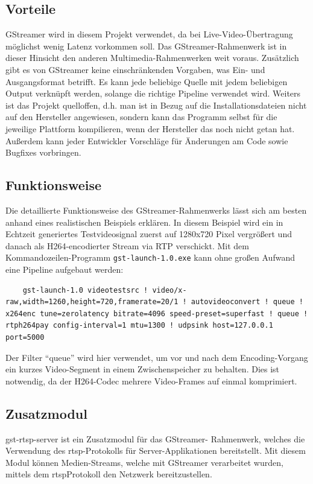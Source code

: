 \subsection{Vorteile}
GStreamer wird in diesem Projekt verwendet, da bei Live-Video-Übertragung möglichst wenig Latenz vorkommen soll.
Das GStreamer-Rahmenwerk ist in dieser Hinsicht den anderen Multimedia-Rahmenwerken weit voraus.
Zusätzlich gibt es von GStreamer keine einschränkenden Vorgaben, was Ein- und Ausgangsformat betrifft.
Es kann jede beliebige Quelle mit jedem beliebigen Output verknüpft werden, solange die richtige Pipeline verwendet wird.
Weiters ist das Projekt quelloffen, d.h. man ist in Bezug auf die Installationsdateien nicht auf den Hersteller angewiesen, sondern kann das Programm selbst für die jeweilige Plattform kompilieren, wenn der Hersteller das noch nicht getan hat.
Außerdem kann jeder Entwickler Vorschläge für Änderungen am Code sowie Bugfixes vorbringen.
\subsection{Funktionsweise}
Die detaillierte Funktionsweise des GStreamer-Rahmenwerks lässt sich am besten anhand eines realistischen Beispiels erklären.
In diesem Beispiel wird ein in Echtzeit generiertes Testvideosignal zuerst auf 1280x720 Pixel vergrößert und danach als H264-encodierter Stream via RTP verschickt.
Mit dem Kommandozeilen-Programm \texttt{gst-launch-1.0.exe} kann ohne großen Aufwand eine Pipeline aufgebaut werden:
\begin{verbatim}
    gst-launch-1.0 videotestsrc ! video/x-raw,width=1260,height=720,framerate=20/1 ! autovideoconvert ! queue ! x264enc tune=zerolatency bitrate=4096 speed-preset=superfast ! queue ! rtph264pay config-interval=1 mtu=1300 ! udpsink host=127.0.0.1 port=5000
\end{verbatim}
Der Filter \enquote{queue} wird hier verwendet, um vor und nach dem Encoding-Vorgang ein kurzes Video-Segment in einem Zwischenspeicher zu behalten. Dies ist notwendig, da der H264-Codec mehrere Video-Frames auf einmal komprimiert.

\subsection{Zusatzmodul}
gst-rtsp-server ist ein Zusatzmodul für das GStreamer- Rahmenwerk, welches die Verwendung des \ac{rtsp}-Protokolls für Server-Applikationen bereitstellt.
Mit diesem Modul können Medien-Streams, welche mit GStreamer verarbeitet wurden, mittels dem \ac{rtsp}Protokoll den Netzwerk bereitzustellen.

